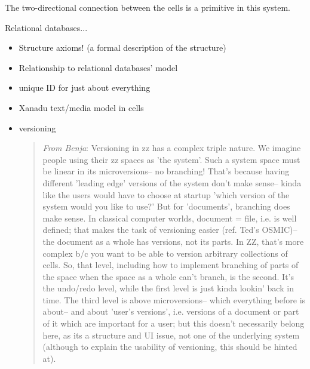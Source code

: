 \documentclass[a4paper]{article}
\begin{document}
The two-directional connection between the cells is a primitive
in this system.

Relational databases...

\begin{itemize}
\item Structure axioms! (a formal description of the structure)
        \item Relationship to relational databases' model
        \item unique ID for just about everything
        \item Xanadu text/media model in cells
        \item versioning
          \begin{quotation}
            \emph{From Benja}: Versioning in zz has a complex triple
            nature. We imagine people using their zz spaces as 'the
            system'. Such a system space must be linear in its
            microversions-- no branching!  That's because having
            different 'leading edge' versions of the system don't make
            sense-- kinda like the users would have to choose at
            startup 'which version of the system would you like to
            use?' But for 'documents', branching does make sense. In
            classical computer worlds, document = file, i.e. is well
            defined; that makes the task of versioning easier (ref.
            Ted's OSMIC)-- the document as a whole has versions, not
            its parts. In ZZ, that's more complex b/c you want to be
            able to version arbitrary collections of cells. So, that
            level, including how to implement branching of parts of
            the space when the space as a whole can't branch, is the
            second. It's the undo/redo level, while the first level is
            just kinda lookin' back in time. The third level is above
            microversions-- which everything before is about-- and
            about 'user's versions', i.e. versions of a document or
            part of it which are important for a user; but this
            doesn't necessarily belong here, as its a structure and UI
            issue, not one of the underlying system (although to
            explain the usability of versioning, this should be hinted
            at).
                

\end{quotation}
\end{itemize}
\end{document}
